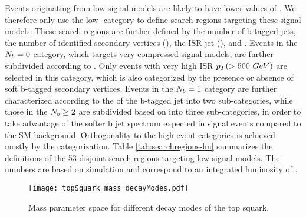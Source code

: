 Events originating from low \dm{} signal models are likely to have lower values of \mtb. We therefore only use the low-\mtb{} category to define search regions targeting these signal models. These search regions are further defined by the number of b-tagged jets, the number of identified secondary vertices (\nsv), the ISR jet \pt (\ptb), and \met. Events in the $N_{b}=0$ category, which targets very compressed signal models, are further subdivided according to \nj. Only events with very high ISR $p_{T}(>500~GeV)$ are selected in this category, which is also categorized by the presence or absence of soft b-tagged secondary vertices. Events in the $N_{b}=1$ category are further characterized according to the \pt{} of the b-tagged jet into two sub-categories, while those in the $N_{b}\geq2$ are subdivided based on \ptbonetwo{} into three sub-categories, in order to take advantage of the softer b jet \pt{} spectrum expected in signal events compared to the SM background. Orthogonality to the high \dm{} event categories is achieved mostly by the \mtb{} categorization. Table \ref{tab:searchregions-lm}  summarizes the definitions of the 53 disjoint search regions targeting low \dm{} signal models. The numbers are based on simulation and correspond to an integrated luminosity of \datalumi. 

\begin{figure}
 	\centering
	\texttt{[image: topSquark\_mass\_decayModes.pdf]}
 	\caption[Top Squark Decay Modes]{Mass parameter space for different decay modes of the top squark.}
 	\label{StopParameterSpace} 
\end{figure}


